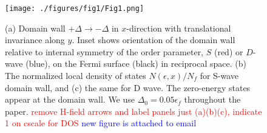 \documentclass[prb,aps,showpacs,amsmath,twocolumn,10pt]{revtex4-1}
\newcommand{\blue}{\textcolor{blue}}
\newcommand{\red}{\textcolor{red}}
\begin{document}
\begin{figure}
\texttt{[image: ./figures/fig1/Fig1.png]}
\caption{\label{fig:1}
(a) Domain wall $+\Delta \to -\Delta$ in $x$-direction with translational
invariance along $y$. Inset shows orientation of the domain wall relative 
to internal symmetry of the order parameter, $S$ (red) or $D$-wave (blue), 
on the Fermi surface (black) in reciprocal space. 
(b) The normalized local density of states $N(\epsilon,x)/N_f$ for S-wave domain wall, and  
(c) the same for D wave. The zero-energy states appear at the domain wall. 
We use $\Delta_0=0.05\epsilon_f$ throughout the paper.  
\red{remove H-field arrows and label panels just (a)(b)(c), indicate 1 on cscale for DOS}
\blue{new figure is attached to email}
} 
\end{figure}

\end{document}
